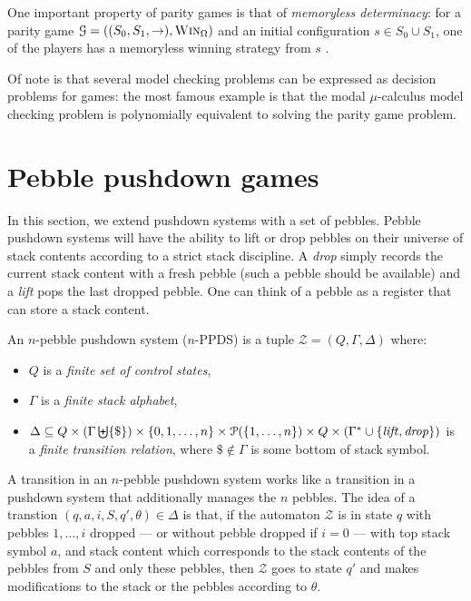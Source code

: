 \documentclass[a4paper,UKenglish,cleveref, autoref, thm-restate]{lipics-v2021}
\newcommand\mh[1]{\todo[inline,size=\scriptsize]{#1 - \textbf{Mathieu}}}
\newcommand{\win}{\textsc{Win}}
\begin{document}
One important property of parity games is that of {\em memoryless determinacy}: for a parity game
$\mathcal{G}= ((S_0,S_1,\rightarrow),\win_\Omega) $ and an initial configuration $s \in S_0 \cup S_1$, one of the players has a memoryless winning strategy from $s$ \cite{zielonka1998infinite}.

Of note is that several model checking problems %
can be expressed as decision problems for games: the most famous example is that the modal $\mu$-calculus model checking problem is polynomially equivalent to solving the parity game problem. 



\section{Pebble pushdown games}

In this section, we extend pushdown systems with a set of pebbles. 
Pebble pushdown systems will have the ability to lift or drop pebbles on their universe of stack contents according to a strict stack discipline. A \textit{drop} simply records the current stack content with a fresh pebble (such a pebble should be available) and a \textit{lift} pops the last dropped pebble. One can think of a pebble as a register that can store a stack content.




\begin{definition}
An $n$-pebble pushdown system ($n$-PPDS) is a tuple $\mathcal{Z} = (Q, \Gamma,  \Delta )$
where:
\begin{itemize}
\item $Q$ is a {\em finite set of control states},
\item $\Gamma$ is a {\em finite stack alphabet},
\item  $\Delta   \subseteq  Q  \times (\Gamma \biguplus \{ \$ \})  \times \{ 0, 1, \ldots, n\} \times \mathcal{P}(\{ 1, \ldots, n\}) \times Q  \times (\Gamma^* \cup \{ \! \! \text{\textit{lift}}, \text{\textit{drop}}\})$ is a {\em finite transition relation}, where ${\$ \notin \Gamma}$ is some bottom of stack symbol.
\end{itemize}
\end{definition}


A transition in an $n$-pebble pushdown system works like a transition in a pushdown system that additionally manages the $n$ pebbles.
The idea of a transtion $(q, a, i, S, q', \theta) \in \Delta$
is that, if the automaton $\mathcal{Z}$ is in state $q$ with pebbles $1,\ldots, i$ dropped \---- or without pebble dropped if $i = 0$ \---- with top stack symbol $a$, and stack content which corresponds to the stack contents of the pebbles from $S$ and only these pebbles, then
$\mathcal{Z}$ goes to state 
$q'$ and makes modifications to the stack or the pebbles according to
$\theta$.
\end{document}
